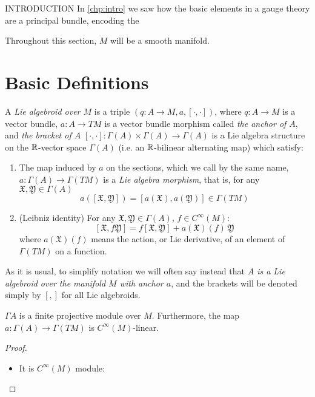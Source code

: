 INTRODUCTION  In \ref{chp:intro} we saw how the basic elements in a gauge theory are a principal bundle, encoding the 


Throughout this section, $M$ will be a smooth manifold.

\section{Basic Definitions}

\begin{definition} 
A \emph{Lie algebroid over $M$} is a triple $(q:A \to M, a, [\cdot, \cdot ])$, where $q:A \to M$ is a vector bundle, $a:A \to TM$ is a vector bundle morphism called \emph{the anchor of $A$}, and \emph{the bracket of $A$} $[\cdot, \cdot ]: \Gamma(A) \times \Gamma(A) \to \Gamma(A)$ is a Lie algebra structure on the $\operatorname{\mathbb{R}}$-vector space $\Gamma(A)$ (i.e. an $\operatorname{\mathbb{R}}$-bilinear alternating map) which satisfy:

\begin{enumerate}
    \item The map induced by $a$ on the sections, which we call by the same name, $a:\Gamma(A) \to \Gamma(TM)$ is a \emph{Lie algebra morphism}, that is, for any $\mathfrak X, \mathfrak Y \in \Gamma(A)$ \[ a([\mathfrak X, \mathfrak Y])  = [a(\mathfrak X), a(\mathfrak Y)] \in  \Gamma(TM)\]
    
    \item (Leibniz identity) For any $\mathfrak X, \mathfrak Y \in \Gamma(A)$, $f \in C^\infty (M)$: \[ [\mathfrak X, f\mathfrak Y] = f[\mathfrak X, \mathfrak Y] + a(\mathfrak X)(f)\, \mathfrak Y \] where $a(\mathfrak X)(f)$ means the action, or Lie derivative, of an element of $\Gamma(TM)$ on a function.
\end{enumerate}
\end{definition}

As it is usual, to simplify notation we will often say instead that \emph{$A$ is a Lie algebroid over the manifold $M$ with anchor $a$}, and the brackets will be denoted simply by $[,]$ for all Lie algebroids.

\begin{proposition}
$\Gamma A$ is a finite projective module over $M$. Furthermore, the map $a: \Gamma(A) \to \Gamma(TM)$ is $C^\infty(M)$-linear.
\end{proposition}
\begin{proof}
\begin{itemize}
    \item It is $C^\infty(M)$ module:
\end{itemize}
\end{proof}

